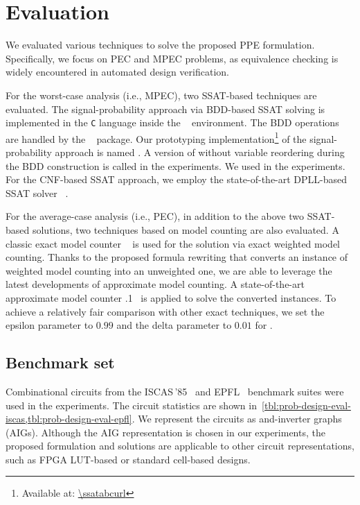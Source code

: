 \section{Evaluation}
\label{sect:prob-evaluation}

We evaluated various techniques to solve the proposed PPE formulation.
Specifically, we focus on PEC and MPEC problems,
as equivalence checking is widely encountered in automated design verification.

For the worst-case analysis (i.e., MPEC), two SSAT-based techniques are evaluated.
The signal-probability approach via BDD-based SSAT solving
is implemented in the \texttt{C} language inside the \abc~\cite{ABC} environment.
The BDD operations are handled by the \cudd~\cite{CUDD} package.
Our prototyping implementation\footnote{Available at: \url{\ssatabcurl}}
of the signal-probability approach is named \bddsp.
A version of \bddsp without variable reordering during the BDD construction
is called \bddspnr in the experiments.
We used \ssatABCRevision in the experiments.
For the CNF-based SSAT approach,
we employ the state-of-the-art DPLL-based SSAT solver \dcssat~\cite{Majercik2005}.

For the average-case analysis (i.e., PEC),
in addition to the above two SSAT-based solutions,
two techniques based on model counting are also evaluated.
A classic exact model counter \cachet~\cite{Sang2004,Sang2005ModelCounting} is used
for the solution via exact weighted model counting.
Thanks to the proposed formula rewriting
that converts an instance of weighted model counting into an unweighted one,
we are able to leverage the latest developments of approximate model counting.
A state-of-the-art approximate model counter .1~\cite{Chakraborty2013,Chakraborty2016}
is applied to solve the converted instances.
To achieve a relatively fair comparison with other exact techniques,
we set the epsilon parameter to $0.99$ and the delta parameter to $0.01$ for \approxmc.

\subsection{Benchmark set}
Combinational circuits from the ISCAS\,'85~\cite{ISCAS85-benchmark}
and EPFL~\cite{EPFL-benchmark} benchmark suites were used in the experiments.
The circuit statistics are shown in~\cref{tbl:prob-design-eval-iscas,tbl:prob-design-eval-epfl}.
We represent the circuits as and-inverter graphs (AIGs).
Although the AIG representation is chosen in our experiments,
the proposed formulation and solutions are applicable to other circuit representations,
such as FPGA LUT-based or standard cell-based designs.


